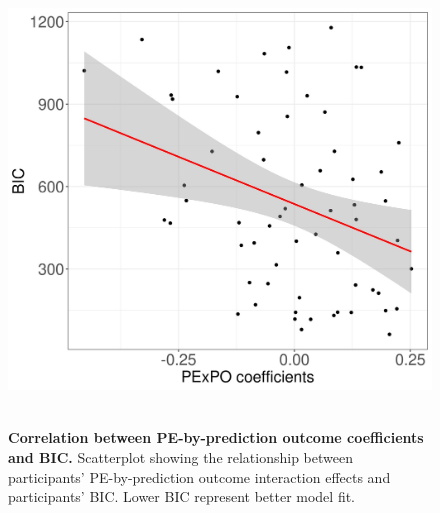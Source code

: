 \documentclass[a4paper,12pt]{article}
\begin{document}
 \begin{figure}
{\includegraphics[width=1\textwidth]{figures/PExPO_BIC.jpg}}\
\caption{\textbf{Correlation between PE-by-prediction outcome coefficients and BIC.} Scatterplot showing the relationship between participants' PE-by-prediction outcome interaction effects and participants' BIC. Lower BIC represent better model fit.  }
\label{fig:PE_PE_BIC}

\end{figure}
 
\end{document}
